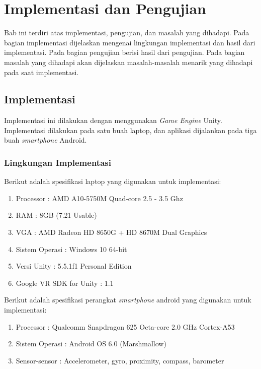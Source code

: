 \chapter{Implementasi dan Pengujian}
\label{chap:implementasi_dan_pengujian}

Bab ini terdiri atas implementasi, pengujian, dan masalah yang dihadapi. Pada bagian implementasi dijelaskan mengenai lingkungan implementasi dan hasil dari implementasi. Pada bagian pengujian berisi hasil dari pengujian. Pada bagian masalah yang dihadapi akan dijelaskan masalah-masalah menarik yang dihadapi pada saat implementasi. 

\section{Implementasi}
\label{sec:implementasi}

Implementasi ini dilakukan dengan menggunakan \textit{Game Engine} Unity. Implementasi dilakukan pada satu buah laptop, dan aplikasi dijalankan pada tiga buah \textit{smartphone} Android. 

\subsection{Lingkungan Implementasi}
\label{ssec:lingkungan_implementasi_dan_pengujian}

Berikut adalah spesifikasi laptop yang digunakan untuk implementasi:
\begin{enumerate}
    \item Processor : AMD A10-5750M Quad-core 2.5 - 3.5 Ghz
    \item RAM : 8GB (7.21 Usable)
    \item VGA : AMD Radeon HD 8650G + HD 8670M Dual Graphics
    \item Sistem Operasi : Windows 10 64-bit
    \item Versi Unity : 5.5.1f1 Personal Edition
    \item Google VR SDK for Unity : 1.1 
\end{enumerate}

Berikut adalah spesifikasi perangkat \textit{smartphone} android yang digunakan untuk implementasi:
\begin{enumerate}
    \item Processor : Qualcomm Snapdragon 625 Octa-core 2.0 GHz Cortex-A53
    \item Sistem Operasi : Android OS 6.0 (Marshmallow)
    \item Sensor-sensor : Accelerometer, gyro, proximity, compass, barometer
\end{enumerate}

